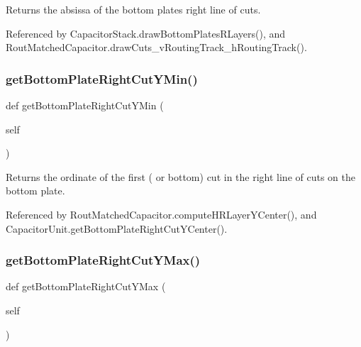 \begin{DoxyReturn}{Returns}
the absissa of the bottom plate\textquotesingle{}s right line of cuts. 
\end{DoxyReturn}


Referenced by Capacitor\+Stack.\+draw\+Bottom\+Plates\+R\+Layers(), and Rout\+Matched\+Capacitor.\+draw\+Cuts\+\_\+v\+Routing\+Track\+\_\+h\+Routing\+Track().

\mbox{\label{classpython_1_1capacitorunit_1_1CapacitorUnit_a27c6ba5c13e8838ffdba1d7005d52cdc}} 
\subsubsection{\texorpdfstring{get\+Bottom\+Plate\+Right\+Cut\+Y\+Min()}{getBottomPlateRightCutYMin()}}
{\footnotesize\ttfamily def get\+Bottom\+Plate\+Right\+Cut\+Y\+Min (\begin{DoxyParamCaption}\item[{}]{self }\end{DoxyParamCaption})}

\begin{DoxyReturn}{Returns}
the ordinate of the first ( or bottom) cut in the right line of cuts on the bottom plate. 
\end{DoxyReturn}


Referenced by Rout\+Matched\+Capacitor.\+compute\+H\+R\+Layer\+Y\+Center(), and Capacitor\+Unit.\+get\+Bottom\+Plate\+Right\+Cut\+Y\+Center().

\mbox{\label{classpython_1_1capacitorunit_1_1CapacitorUnit_ac90114c3fc7731a8de7a65136371759b}} 
\subsubsection{\texorpdfstring{get\+Bottom\+Plate\+Right\+Cut\+Y\+Max()}{getBottomPlateRightCutYMax()}}
{\footnotesize\ttfamily def get\+Bottom\+Plate\+Right\+Cut\+Y\+Max (\begin{DoxyParamCaption}\item[{}]{self }\end{DoxyParamCaption})}

